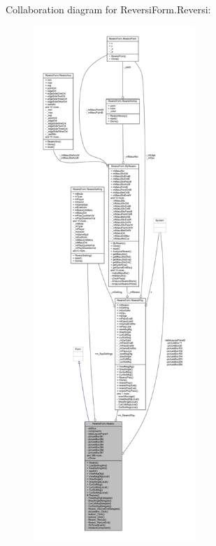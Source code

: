 Collaboration diagram for Reversi\+Form.\+Reversi\+:
\nopagebreak
\begin{figure}[H]
\begin{center}
\leavevmode
\includegraphics[height=550pt]{class_reversi_form_1_1_reversi__coll__graph}
\end{center}
\end{figure}
